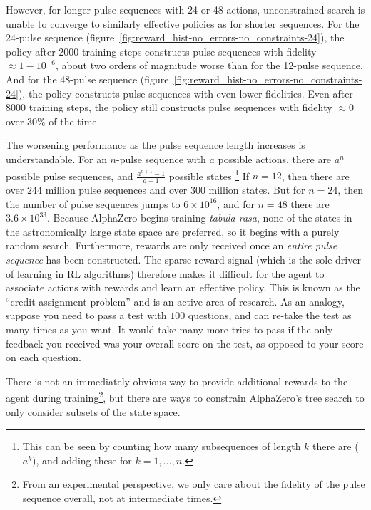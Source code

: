 However, for longer pulse sequences with 24 or 48 actions, unconstrained search is unable to converge to similarly effective policies as for shorter sequences. For the 24-pulse sequence (figure~\ref{fig:reward_hist-no_errors-no_constraints-24}), the policy after 2000 training steps constructs pulse sequences with fidelity $\approx 1 - 10^{-6}$, about two orders of magnitude worse than for the 12-pulse sequence.
And for the 48-pulse sequence (figure~\ref{fig:reward_hist-no_errors-no_constraints-24}), the policy constructs pulse sequences with even lower fidelities. Even after 8000 training steps, the policy still constructs pulse sequences with fidelity $\approx 0$ over $30\%$ of the time.

The worsening performance as the pulse sequence length increases is understandable. For an $n$-pulse sequence with $a$ possible actions, there are $a^n$ possible pulse sequences, and $\frac{a^{n+1} - 1}{a-1}$ possible states%
\footnote{
This can be seen by counting how many subsequences of length $k$ there are ($a^k$), and adding these for $k = 1, \dots, n$.
}
If $n=12$, then there are over $244$ million pulse sequences and over $300$ million states.
But for $n=24$, then the number of pulse sequences jumps to $6 \times 10^{16}$, and for $n=48$ there are $3.6 \times 10^{33}$. Because AlphaZero begins training \emph{tabula rasa}, none of the states in the astronomically large state space are preferred, so it begins with a purely random search.
Furthermore, rewards are only received once an \emph{entire pulse sequence} has been constructed. The sparse reward signal (which is the sole driver of learning in RL algorithms) therefore makes it difficult for the agent to associate actions with rewards and learn an effective policy.
This is known as the ``credit assignment problem'' and is an active area of research.
As an analogy, suppose you need to pass a test with $100$ questions, and can re-take the test as many times as you want. It would take many more tries to pass if the only feedback you received was your overall score on the test, as opposed to your score on each question.

There is not an immediately obvious way to provide additional rewards to the agent during training\footnote{
From an experimental perspective, we only care about the fidelity of the pulse sequence overall, not at intermediate times.
},
but there are ways to constrain AlphaZero's tree search to only consider subsets of the state space.

